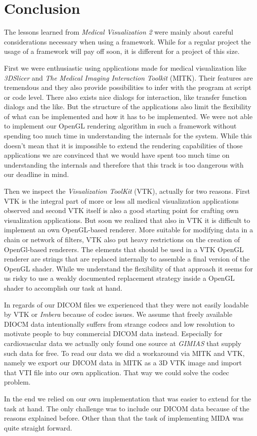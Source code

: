 \section{Conclusion}

The lessons learned from \emph{Medical Visualization 2} were mainly about careful considerations necessary when using a framework.
While for a regular project the usage of a framework will pay off soon, it is different for a project of this size.

First we were enthusiastic using applications made for medical visualization like \emph{3DSlicer} and \emph{The Medical Imaging Interaction Toolkit} (MITK). Their features are tremendous and they also provide possibilities to infer with the program at script or code level. There also exists nice dialogs for interaction, like transfer function dialogs and the like.
But the structure of the applications also limit the flexibility of what can be implemented and how it has to be implemented.
We were not able to implement our OpenGL rendering algorithm in such a framework without spending too much time in understanding the internals for the system. While this doesn't mean that it is impossible to extend the rendering capabilities of those applications we are convinced that we would have spent too much time on understanding the internals and therefore that this track is too dangerous with our deadline in mind. 

Then we inspect the \emph{Visualization ToolKit} (VTK), actually for two reasons. First VTK is the integral part of more or less all medical visualization applications observed and second VTK itself is also a good starting point for crafting own visualization applications.
But soon we realized that also in VTK it is difficult to implement an own OpenGL-based renderer. More suitable for modifying data in a chain or network of filters, VTK also put heavy restrictions on the creation of OpenGl-based renderers. The elements that should be used in a VTK OpenGL renderer are strings that are replaced internally to assemble a final version of the OpenGL shader. While we understand the flexibility of that approach it seems for us risky to use a weakly documented replacement strategy inside a OpenGL shader to accomplish our task at hand.  

In regards of our DICOM files we experienced that they were not easily loadable by VTK or \emph{Imbera} because of codec issues. We assume that freely available DIOCM data intentionally suffers from strange codecs and low resolution to motivate people to buy commercial DICOM data instead.
Especially for cardiovascular data we actually only found one source at \emph{GIMIAS} that supply such data for free.
To read our data we did a workaround via MITK and VTK, namely we export our DICOM data in MITK as a 3D VTK image and import that VTI file into our own application. That way we could solve the codec problem.


In the end we relied on our own implementation that was easier to extend for the task at hand. The only challenge was to include our DICOM data because of the reasons explained before. Other than that the task of implementing MIDA was quite straight forward.

